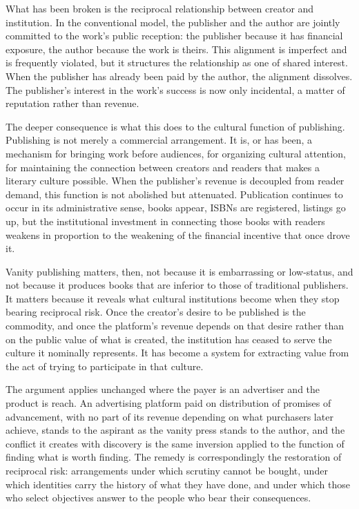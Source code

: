 \documentclass[12pt, a4paper]{article}
\begin{document}
What has been broken is the reciprocal relationship between creator and institution. In the conventional model, the publisher and the author are jointly committed to the work's public reception: the publisher because it has financial exposure, the author because the work is theirs. This alignment is imperfect and is frequently violated, but it structures the relationship as one of shared interest. When the publisher has already been paid by the author, the alignment dissolves. The publisher's interest in the work's success is now only incidental, a matter of reputation rather than revenue.

The deeper consequence is what this does to the cultural function of publishing. Publishing is not merely a commercial arrangement. It is, or has been, a mechanism for bringing work before audiences, for organizing cultural attention, for maintaining the connection between creators and readers that makes a literary culture possible. When the publisher's revenue is decoupled from reader demand, this function is not abolished but attenuated. Publication continues to occur in its administrative sense, books appear, ISBNs are registered, listings go up, but the institutional investment in connecting those books with readers weakens in proportion to the weakening of the financial incentive that once drove it.

Vanity publishing matters, then, not because it is embarrassing or low-status, and not because it produces books that are inferior to those of traditional publishers. It matters because it reveals what cultural institutions become when they stop bearing reciprocal risk. Once the creator's desire to be published is the commodity, and once the platform's revenue depends on that desire rather than on the public value of what is created, the institution has ceased to serve the culture it nominally represents. It has become a system for extracting value from the act of trying to participate in that culture.


The argument applies unchanged where the payer is an advertiser and the product is reach. An advertising platform paid on distribution of promises of advancement, with no part of its revenue depending on what purchasers later achieve, stands to the aspirant as the vanity press stands to the author, and the conflict it creates with discovery is the same inversion applied to the function of finding what is worth finding. The remedy is correspondingly the restoration of reciprocal risk: arrangements under which scrutiny cannot be bought, under which identities carry the history of what they have done, and under which those who select objectives answer to the people who bear their consequences.

\nocite{zuboff2019,lanier2013,bommasani2021}



\end{document}

